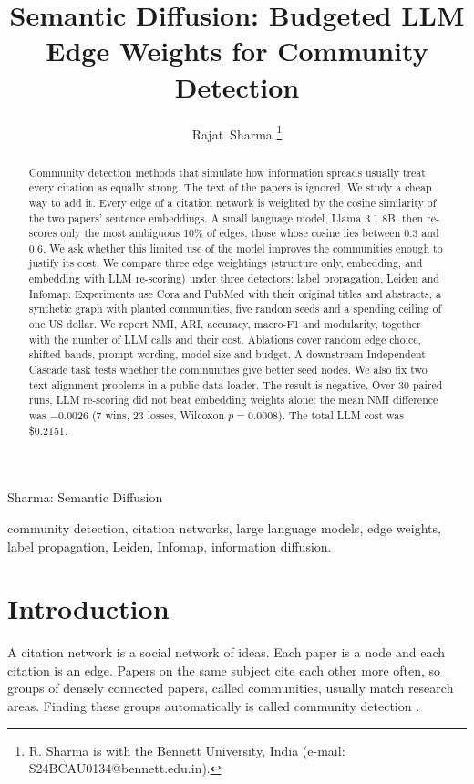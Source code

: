 \documentclass[journal]{IEEEtran}
\newcommand{\abstractresult}{The result is negative. Over 30 paired runs, LLM re-scoring did not beat embedding weights alone: the mean NMI difference was $-0.0026$ (7 wins, 23 losses, Wilcoxon $p=0.0008$). The total LLM cost was \$0.2151.}
\begin{document}
\title{Semantic Diffusion: Budgeted LLM Edge Weights for Community Detection}

\author{Rajat~Sharma%
\thanks{R. Sharma is with the Bennett University, India (e-mail: S24BCAU0134@bennett.edu.in).}}

%
{Sharma: Semantic Diffusion}

\maketitle

\begin{abstract}
Community detection methods that simulate how information spreads usually treat every citation as equally strong. The text of the papers is ignored. We study a cheap way to add it. Every edge of a citation network is weighted by the cosine similarity of the two papers' sentence embeddings. A small language model, Llama 3.1 8B, then re-scores only the most ambiguous 10\% of edges, those whose cosine lies between 0.3 and 0.6. We ask whether this limited use of the model improves the communities enough to justify its cost. We compare three edge weightings (structure only, embedding, and embedding with LLM re-scoring) under three detectors: label propagation, Leiden and Infomap. Experiments use Cora and PubMed with their original titles and abstracts, a synthetic graph with planted communities, five random seeds and a spending ceiling of one US dollar. We report NMI, ARI, accuracy, macro-F1 and modularity, together with the number of LLM calls and their cost. Ablations cover random edge choice, shifted bands, prompt wording, model size and budget. A downstream Independent Cascade task tests whether the communities give better seed nodes. We also fix two text alignment problems in a public data loader. \abstractresult
\end{abstract}

\begin{IEEEkeywords}
community detection, citation networks, large language models, edge weights, label propagation, Leiden, Infomap, information diffusion.
\end{IEEEkeywords}

\IEEEpeerreviewmaketitle

\section{Introduction}
\label{sec:intro}
A citation network is a social network of ideas. Each paper is a node and each citation is an edge. Papers on the same subject cite each other more often, so groups of densely connected papers, called communities, usually match research areas. Finding these groups automatically is called community detection \cite{fortunato2010}.
\end{document}
